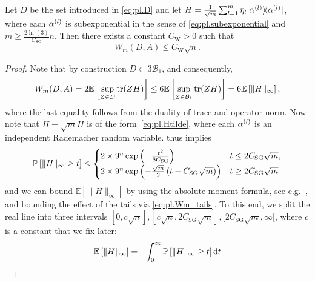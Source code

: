 \begin{lemma}
  Let $D$ be the set introduced in \cref{eq:pl.D} and let $ H = \frac{1}{\sqrt{m}} \sum_{l=1}^m \eta_l \ketbra{\alpha\ind{l}}$, where each $\alpha^{(l)}$ is subexponential in the sense of \eqref{eq:pl.subexponential} and $m \geq \frac{2 \ln (3)}{C_\mathrm{SG}} n$.
  Then there exists a constant $C_\mathrm{W} >0$ such that
  \[
    W_m (D, A) \leq C_\mathrm{W} \sqrt{n}.
  \]
\end{lemma}
\begin{proof}
  Note that by construction $D \subset 3 \mathcal{B}_1$, and consequently,
  \begin{align}
    W_m (D,  A) = 2 \mathbb{E} \left[ \sup_{ Z \in D} \operatorname{tr} ( Z  H) \right] \leq 6 \mathbb{E} \left[ \sup_{ Z \in \mathcal{B}_1} \operatorname{tr} ( Z  H) \right] = 6 \mathbb{E} \left[ \|  H \|_\infty  \right], \label{eq:pl.Wm_hoelder}
  \end{align}
  where the last equality follows from the duality of trace and operator norm.
  Now note that $\tilde{ H} = \sqrt{m}  H$ is of the form~\eqref{eq:pl.Htilde}, where each $\alpha^{(l)}$ is an independent Rademacher random variable.
   thus implies
  \begin{align}
    \mathbb{P} \left[\|  H \|_\infty \geq t \right]
    \leq
    \begin{cases}
     2 \times 9^n \exp \left( - \frac{t^2}{8 C_\mathrm{SG}} \right) & t \leq 2C_\mathrm{SG} \sqrt{m}, \\
    2 \times 9^n \exp \left( - \frac{\sqrt{m}}{2} \left( t - C_\mathrm{SG} \sqrt{m} \right) \right) & t \geq 2 C_\mathrm{SG} \sqrt{m}
    \end{cases}
    \label{eq:pl.Wm_tails}
  \end{align}
  and we can bound $\mathbb{E} \left[ \|  H \|_\infty \right]$ by using the absolute moment formula,
  see e.g.\ \cite[Propostion~7.1]{Foucart_2013_Mathematical}, and bounding the effect of the tails via \eqref{eq:pl.Wm_tails}.
  To this end, we split the real line into three intervals $[0, c \sqrt{n}], [c\sqrt{n}, 2 C_\mathrm{SG} \sqrt{m}], [2 C_\mathrm{SG} \sqrt{m},\infty[$, where $c$ is a constant that we fix later:
  \begin{align}
    \mathbb{E} \left[ \| H\|_\infty \right]
    &=& \int_0^\infty \Prob \left[ \| H\|_\infty \geq t \right] \mathrm{d}t \\

\end{align}
\end{proof}
